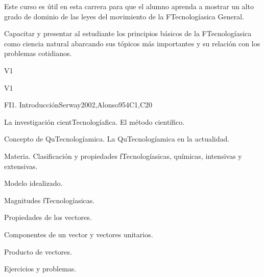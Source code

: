 \begin{syllabus}


\begin{justification}

Este curso es útil en esta carrera para que el alumno aprenda a mostrar un alto grado de dominio de las leyes del movimiento de la FTecnologíasica General.

\end{justification}

\begin{goals}
\item Capacitar y presentar al estudiante los principios básicos de la FTecnologíasica como ciencia natural abarcando sus tópicos más importantes y su relación con los problemas cotidianos.
\end{goals}

\begin{outcomes}{V1}
  \item {}
  \item {}
  \item {}
\end{outcomes}

\begin{competences}{V1}
    \item {}
    \item {}
\end{competences}

\begin{unit}{FI1. Introducción}{}{Serway2002,Alonso95}{4}{C1,C20}
\begin{topics}
      \item La investigación cientTecnologíafica. El método científico.
      \item Concepto de QuTecnologíamica. La QuTecnologíamica en la actualidad.
      \item Materia. Clasificación y propiedades fTecnologíasicas, químicas, intensivas y extensivas.
      \item Modelo idealizado.
      \item Magnitudes fTecnologíasicas.
      \item Propiedades de los vectores.
      \item Componentes de un vector y vectores unitarios.
      \item Producto de vectores.
      \item Ejercicios y problemas.
   \end{topics}


\end{unit}
\end{syllabus}
